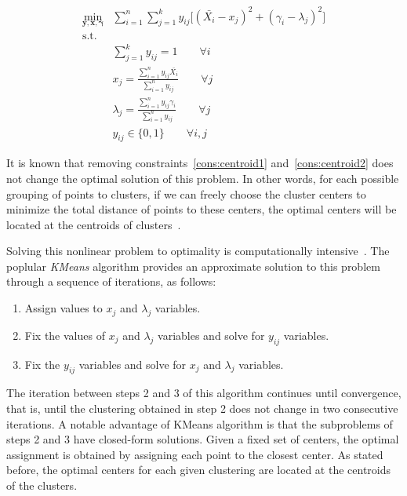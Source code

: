 \documentclass{scrartcl}
\begin{document}
\begin{multicols*}{2}
\begin{align}
\min_{\mathbf{y, x, \gamma}} & \sum_{i=1}^{n} \sum_{j=1}^{k} y_{ij} \big[ (\bar{X_i} - x_j)^2 + (\gamma_i - \lambda_j)^2 \big] \nonumber \\
\text{s.t.} & \nonumber \\
& \sum_{j=1}^k y_{ij} = 1 \qquad \forall i \\
& x_j = \frac{\sum_{i=1}^{n} y_{ij} \bar{X_i}}{\sum_{i=1}^{n} y_{ij}}  \qquad \forall j \label{cons:centroid1}\\
& \lambda_j = \frac{\sum_{i=1}^{n} y_{ij} \gamma_i}{\sum_{i=1}^{n} y_{ij}} \qquad \forall j \label{cons:centroid2}\\
& y_{ij} \in \{0, 1\} \qquad \forall i, j \nonumber
\end{align}

It is known that removing constraints~\ref{cons:centroid1} and~\ref{cons:centroid2} does not change the optimal solution of this problem. In other words, for each possible grouping of points to clusters, if we can freely choose the cluster centers to minimize the total distance of points to these centers, the optimal centers will be located at the centroids of clusters~\cite{AloiseHL12}.  

Solving this nonlinear problem to optimality is computationally intensive~\cite{AloiseDHP09}. The poplular \emph{KMeans} algorithm provides an approximate solution to this problem through a sequence of iterations, as follows: 

\begin{enumerate}
\item Assign values to $x_j$ and $\lambda_j$ variables. 
\item Fix the values of $x_j$ and $\lambda_j$ variables and solve  for $y_{ij}$ variables.
\item Fix the $y_{ij}$ variables and solve for $x_j$ and $\lambda_j$ variables.
\end{enumerate}

The iteration between steps 2 and 3 of this algorithm continues until convergence, that is, until the clustering obtained in step 2 does not change in two consecutive iterations. A notable advantage of KMeans algorithm is that the subproblems of steps 2 and 3 have closed-form solutions. Given a fixed set of centers, the optimal assignment is obtained by assigning each point to the closest center. As stated before, the optimal centers for each given clustering are located at the centroids of the clusters. 


\end{multicols*}
\end{document}
